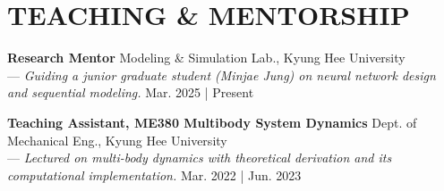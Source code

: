 \documentclass[a4paper,10pt]{extarticle}
\begin{document}
\section*{TEACHING \& MENTORSHIP}
\textbf{Research Mentor} \hfill Modeling \& Simulation Lab., Kyung Hee University\\
--- {\footnotesize\textsl{Guiding a junior graduate student (Minjae Jung) on neural network design and sequential modeling.}} \hfill Mar. 2025 | Present\\ %
\vspace*{-0.2cm}

\noindent
\textbf{Teaching Assistant, ME380 Multibody System Dynamics} \hfill Dept. of Mechanical Eng., Kyung Hee University\\
--- {\footnotesize\textsl{Lectured on multi-body dynamics with theoretical derivation and its computational implementation.}} \hfill Mar. 2022 | Jun. 2023 %


\end{document}
